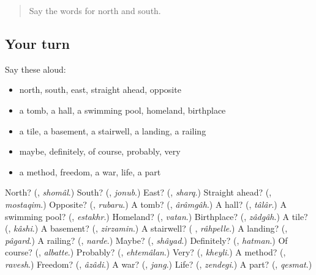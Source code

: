 \begin{quote}
Say the words for north and south.
\end{quote}

\subsection*{Your turn}
Say these aloud:

\begin{itemize}
\raggedright
  \item north, south, east, straight ahead, opposite
  \item a tomb, a hall, a swimming pool, homeland, birthplace
  \item a tile, a basement, a stairwell, a landing, a railing
  \item maybe, definitely, of course, probably, very
  \item a method, freedom, a war, life, a part
\end{itemize}

\begin{tcolorbox}[breakable,colback=teal!4,colframe=teal!35!black,title={Before you move on}]
North? (\textbf{}, \emph{shomâl}.) South? (\textbf{}, \emph{jonub}.) East? (\textbf{}, \emph{sharq}.) Straight ahead? (\textbf{}, \emph{mostaqim}.) Opposite? (\textbf{}, \emph{rubaru}.) A tomb? (\textbf{}, \emph{ârâmgâh}.) A hall? (\textbf{}, \emph{tâlâr}.) A swimming pool? (\textbf{}, \emph{estakhr}.) Homeland? (\textbf{}, \emph{vatan}.) Birthplace? (\textbf{}, \emph{zâdgâh}.) A tile? (\textbf{}, \emph{kâshi}.) A basement? (\textbf{}, \emph{zirzamin}.) A stairwell? (\textbf{ }, \emph{râhpelle}.) A landing? (\textbf{}, \emph{pâgard}.) A railing? (\textbf{}, \emph{narde}.) Maybe? (\textbf{}, \emph{shâyad}.) Definitely? (\textbf{}, \emph{hatman}.) Of course? (\textbf{}, \emph{albatte}.) Probably? (\textbf{}, \emph{ehtemâlan}.) Very? (\textbf{}, \emph{kheyli}.) A method? (\textbf{}, \emph{ravesh}.) Freedom? (\textbf{}, \emph{âzâdi}.) A war? (\textbf{}, \emph{jang}.) Life? (\textbf{}, \emph{zendegi}.) A part? (\textbf{}, \emph{qesmat}.)
\end{tcolorbox}

